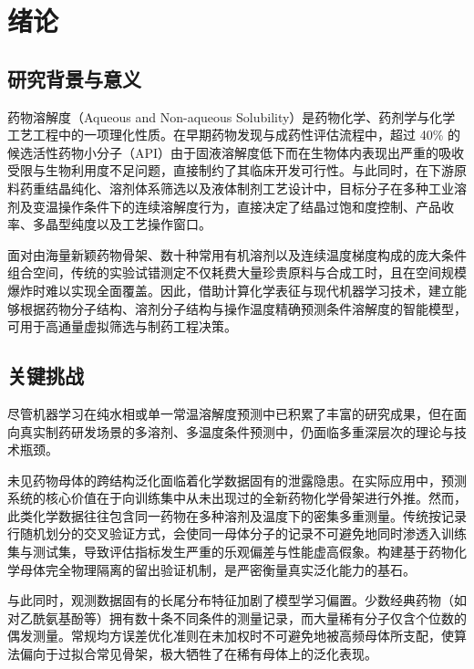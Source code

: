 \section{绪论}

\subsection{研究背景与意义}

药物溶解度（Aqueous and Non-aqueous Solubility）是药物化学、药剂学与化学工艺工程中的一项理化性质。在早期药物发现与成药性评估流程中，超过 40\% 的候选活性药物小分子（API）由于固液溶解度低下而在生物体内表现出严重的吸收受限与生物利用度不足问题，直接制约了其临床开发可行性\cite{delaney2004,solubility2024}。与此同时，在下游原料药重结晶纯化、溶剂体系筛选以及液体制剂工艺设计中，目标分子在多种工业溶剂及变温操作条件下的连续溶解度行为，直接决定了结晶过饱和度控制、产品收率、多晶型纯度以及工艺操作窗口\cite{vermeire2022,fastsolv2025}。

面对由海量新颖药物骨架、数十种常用有机溶剂以及连续温度梯度构成的庞大条件组合空间，传统的实验试错测定不仅耗费大量珍贵原料与合成工时，且在空间规模爆炸时难以实现全面覆盖\cite{boobier2020,ye2021}。因此，借助计算化学表征与现代机器学习技术，建立能够根据药物分子结构、溶剂分子结构与操作温度精确预测条件溶解度的智能模型，可用于高通量虚拟筛选与制药工程决策\cite{vermeire2022,fastsolv2025}。

\subsection{关键挑战}

尽管机器学习在纯水相或单一常温溶解度预测中已积累了丰富的研究成果\cite{delaney2004,solubility2024}，但在面向真实制药研发场景的多溶剂、多温度条件预测中，仍面临多重深层次的理论与技术瓶颈。

未见药物母体的跨结构泛化面临着化学数据固有的泄露隐患。在实际应用中，预测系统的核心价值在于向训练集中从未出现过的全新药物化学骨架进行外推。然而，此类化学数据往往包含同一药物在多种溶剂及温度下的密集多重测量。传统按记录行随机划分的交叉验证方式，会使同一母体分子的记录不可避免地同时渗透入训练集与测试集，导致评估指标发生严重的乐观偏差与性能虚高假象\cite{leakage2023,solubility2024}。构建基于药物化学母体完全物理隔离的留出验证机制，是严密衡量真实泛化能力的基石\cite{varma2006,cawley2010}。

与此同时，观测数据固有的长尾分布特征加剧了模型学习偏置。少数经典药物（如对乙酰氨基酚等）拥有数十条不同条件的测量记录，而大量稀有分子仅含个位数的偶发测量。常规均方误差优化准则在未加权时不可避免地被高频母体所支配，使算法偏向于过拟合常见骨架，极大牺牲了在稀有母体上的泛化表现。

